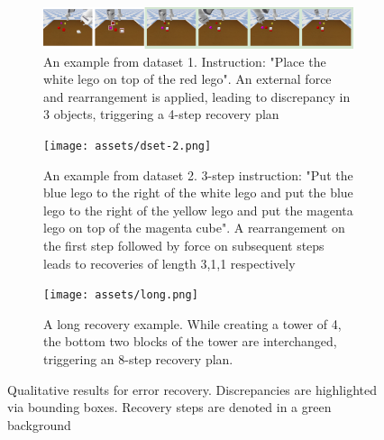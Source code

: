 \begin{figure}
    \centering
    \begin{subfigure}{\textwidth}
        \includegraphics[width=\textwidth]{assets/dset1.png}
        \caption{An example from dataset 1. Instruction: "Place the white lego on top of the red lego". An external force and rearrangement is applied, leading to discrepancy in 3 objects, triggering a 4-step recovery plan}
    \end{subfigure}

    \vspace{1cm}

    \begin{subfigure}{\textwidth}
        \texttt{[image: assets/dset-2.png]}
        \caption{An example from dataset 2. 3-step instruction: "Put the blue lego to the right of the white lego and put the blue lego to the right of the yellow lego and put the magenta lego on top of the magenta cube". A  rearrangement on the first step followed by force on subsequent steps leads to recoveries of length 3,1,1 respectively}
    \end{subfigure}

    \vspace{1cm}

    \begin{subfigure}{\textwidth}
        \texttt{[image: assets/long.png]}
        \caption{A long recovery example. While creating a tower of 4, the bottom two blocks of the tower are interchanged, triggering an 8-step recovery plan.}
    \end{subfigure}

    \vspace{1cm}
    
    
    \caption{Qualitative results for error recovery. Discrepancies are highlighted via bounding boxes. Recovery steps are denoted in a green background}
    \label{fig:error-qualit}
\end{figure}





